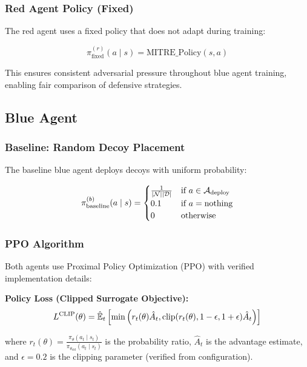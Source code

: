 \documentclass[12pt]{article}
\theoremstyle{definition}
\theoremstyle{plain}
\begin{document}
\subsubsection{Red Agent Policy (Fixed)}
The red agent uses a fixed policy that does not adapt during training:

\begin{equation}
\pi^{(r)}_{\text{fixed}}(a \mid s) = \text{MITRE\_Policy}(s, a)
\end{equation}

This ensures consistent adversarial pressure throughout blue agent training, enabling fair comparison of defensive strategies.

\subsection{Blue Agent}

\subsubsection{Baseline: Random Decoy Placement}
The baseline blue agent deploys decoys with uniform probability:

\begin{equation}
\pi^{(b)}_{\text{baseline}}(a \mid s) = \begin{cases}
\frac{1}{|\mathcal{N}||\mathcal{D}|} & \text{if } a \in \mathcal{A}_{\text{deploy}} \\
0.1 & \text{if } a = \text{nothing} \\
0 & \text{otherwise}
\end{cases}
\end{equation}

\subsubsection{PPO Algorithm}

Both agents use Proximal Policy Optimization (PPO) with verified implementation details:

\textbf{Policy Loss (Clipped Surrogate Objective):}
\begin{equation}
L^{\text{CLIP}}(\theta) = \hat{\mathbb{E}}_t\left[\min\left(r_t(\theta)\hat{A}_t, \text{clip}(r_t(\theta), 1-\epsilon, 1+\epsilon)\hat{A}_t\right)\right]
\end{equation}

where $r_t(\theta) = \frac{\pi_\theta(a_t \mid s_t)}{\pi_{\theta_{\text{old}}}(a_t \mid s_t)}$ is the probability ratio, $\hat{A}_t$ is the advantage estimate, and $\epsilon = 0.2$ is the clipping parameter (verified from configuration).
\end{document}
